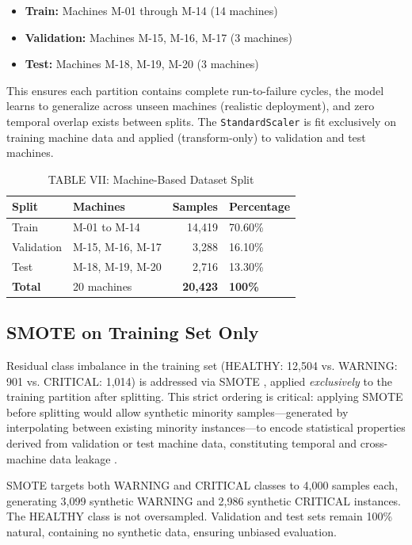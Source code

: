 \documentclass[conference]{IEEEtran}
\begin{document}
\begin{itemize}
\item \textbf{Train:} Machines M-01 through M-14 (14 machines)
\item \textbf{Validation:} Machines M-15, M-16, M-17 (3 machines)
\item \textbf{Test:} Machines M-18, M-19, M-20 (3 machines)
\end{itemize}

This ensures each partition contains complete run-to-failure cycles, the model learns to generalize across unseen machines (realistic deployment), and zero temporal overlap exists between splits. The \texttt{StandardScaler} is fit exclusively on training machine data and applied (transform-only) to validation and test machines.

\begin{table}[htbp]
\caption{TABLE VII: Machine-Based Dataset Split}
\centering
\begin{tabular}{llrl}
\hline
\textbf{Split} & \textbf{Machines} & \textbf{Samples} & \textbf{Percentage} \\
\hline
Train & M-01 to M-14 & 14,419 & 70.60\% \\
Validation & M-15, M-16, M-17 & 3,288 & 16.10\% \\
Test & M-18, M-19, M-20 & 2,716 & 13.30\% \\
\hline
\textbf{Total} & 20 machines & \textbf{20,423} & \textbf{100\%} \\
\hline
\end{tabular}
\label{tab:split}
\end{table}

\subsection{SMOTE on Training Set Only}

Residual class imbalance in the training set (HEALTHY: 12,504 vs. WARNING: 901 vs. CRITICAL: 1,014) is addressed via SMOTE \cite{chawla2002smote}, applied \textit{exclusively} to the training partition after splitting. This strict ordering is critical: applying SMOTE before splitting would allow synthetic minority samples—generated by interpolating between existing minority instances—to encode statistical properties derived from validation or test machine data, constituting temporal and cross-machine data leakage \cite{kaufman2012leakage}.

SMOTE targets both WARNING and CRITICAL classes to 4,000 samples each, generating 3,099 synthetic WARNING and 2,986 synthetic CRITICAL instances. The HEALTHY class is not oversampled. Validation and test sets remain 100\% natural, containing no synthetic data, ensuring unbiased evaluation.
\end{document}
